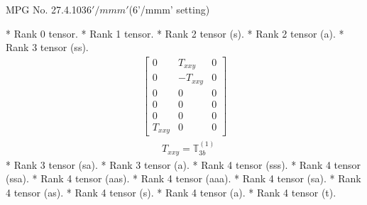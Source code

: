 \documentclass[fleqn,8pt,landscape]{jsarticle}
\begin{document}
\setcounter{MaxMatrixCols}{32}

\renewcommand{\tablename}{Table~}
\renewcommand{\figurename}{Figure~}
\begin{center}
\LARGE
MPG No. 27.4.103\quad$6'/mmm'$\quad(6'/mmm' setting)
\end{center}
* Rank 0 tensor.
* Rank 1 tensor.
* Rank 2 tensor (s).
* Rank 2 tensor (a).
* Rank 3 tensor (ss).
\begin{align*}
\begin{bmatrix} 0 & T_{xxy} & 0 \\ 0 & - T_{xxy} & 0 \\ 0 & 0 & 0 \\ 0 & 0 & 0 \\ 0 & 0 & 0 \\ T_{xxy} & 0 & 0 \end{bmatrix}
\end{align*}
\begin{align*}
& T_{xxy} = \mathbb{T}_{3b}^{(1)}
\end{align*}
* Rank 3 tensor (sa).
* Rank 3 tensor (a).
* Rank 4 tensor (sss).
* Rank 4 tensor (ssa).
* Rank 4 tensor (aas).
* Rank 4 tensor (aaa).
* Rank 4 tensor (sa).
* Rank 4 tensor (as).
* Rank 4 tensor (s).
* Rank 4 tensor (a).
* Rank 4 tensor (t).
\end{document}
